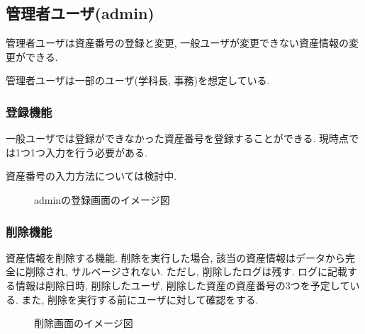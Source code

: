 \documentclass[11ptm]{jsarticle}
\begin{document}
\clearpage
\subsection{管理者ユーザ(admin)}
\label{subsec:管理者ユーザ(admin)}
管理者ユーザは資産番号の登録と変更, 一般ユーザが変更できない資産情報の変更ができる. \par
管理者ユーザは一部のユーザ(学科長, 事務)を想定している. 

\subsubsection{登録機能}
\label{subsubsec:登録機能}
一般ユーザでは登録ができなかった資産番号を登録することができる. 現時点では1つ1つ入力を行う必要がある. \par
資産番号の入力方法については検討中. 
\begin{figure}[h]
  \centering
  \caption{\label{fig:adminの登録画面のイメージ図}adminの登録画面のイメージ図}
\end{figure}\par

\clearpage
\subsubsection{削除機能}
\label{subsubsec:削除機能}
資産情報を削除する機能. 削除を実行した場合, 該当の資産情報はデータから完全に削除され, サルベージされない. ただし, 削除したログは残す. ログに記載する情報は削除日時, 削除したユーザ, 削除した資産の資産番号の3つを予定している. また, 削除を実行する前にユーザに対して確認をする.
\begin{figure}[h]
  \centering
  \caption{\label{fig:削除画面のイメージ図}削除画面のイメージ図}
\end{figure}\par
\end{document}
